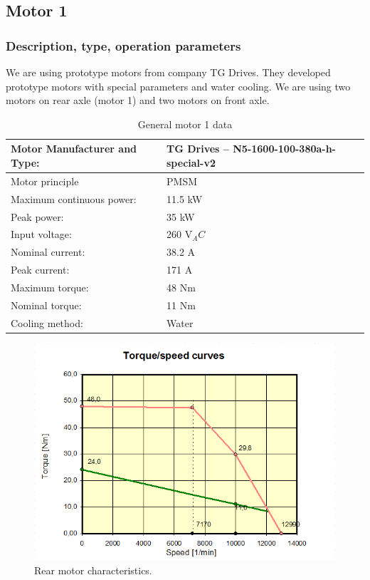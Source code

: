 \subsection{Motor 1}

\subsubsection{Description, type, operation parameters}

We are using prototype motors from company TG Drives. They developed prototype motors with special parameters and water cooling. We are using two motors on rear axle (motor 1) and two motors on front axle.
\begin{table}[H]
	\centering
	\caption{General motor 1 data}
	\begin{tabularx}{\textwidth}{|X|X|}\hline
		Motor Manufacturer and Type: & TG Drives – N5-1600-100-380a-h-special-v2 \\[\TableSize]\hline
		Motor principle & PMSM \\[\TableSize]\hline
		Maximum continuous power: & 11.5 kW \\[\TableSize]\hline
		Peak power: & 35 kW \\[\TableSize]\hline
		Input voltage: & 260 V$_AC$ \\[\TableSize]\hline
		Nominal current: & 38.2 A \\[\TableSize]\hline
		Peak current: & 171 A \\[\TableSize]\hline
		Maximum torque: & 48 Nm \\[\TableSize]\hline
		Nominal torque: & 11 Nm \\[\TableSize]\hline
		Cooling method: & Water \\[\TableSize]\hline
	\end{tabularx}%
	\label{tab:motors1-general}%
\end{table}%

\begin{figure}[H]
	\centering
	\includegraphics[width=\textwidth]{./img/MOTOR1-torque.png}
	\caption{Rear motor characteristics.}
	\label{fig:torque1}
\end{figure}

